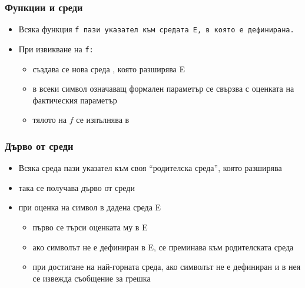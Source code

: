 \documentclass{beamer}
\begin{document}
\begin{frame}
  \frametitle{Функции и среди}

  \begin{itemize}[<+->]
  \item Всяка функция \tt f пази указател към средата \env E, в която е дефинирана.
  \item При извикване на \tt f:
    \begin{itemize}
    \item създава се нова среда , която разширява \env E
    \item в  всеки символ означаващ формален параметър се свързва с оценката на фактическия параметър
    \item тялото на $f$ се изпълнява в 
    \end{itemize}
  \end{itemize}
\end{frame}

\begin{frame}
  \frametitle{Дърво от среди}
  \begin{itemize}[<+->]
  \item Всяка среда пази указател към своя ``родителска среда'', която разширява
  \item така се получава дърво от среди
  \item при оценка на символ в дадена среда \env E
    \begin{itemize}
    \item първо се търси оценката му в \env E
    \item ако символът не е дефиниран в \env E, се преминава към родителската среда
    \item при достигане на най-горната среда, ако символът не е дефиниран и в нея се извежда съобщение за грешка
    \end{itemize}
  \end{itemize}
\end{frame}
\end{document}
